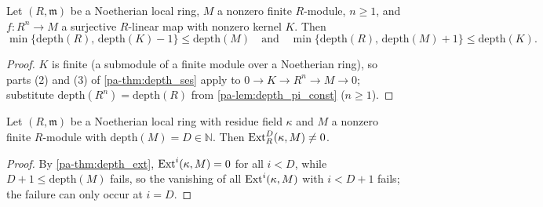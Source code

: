 \begin{lemma}
  \label{pa-lem:depth_ses_kernel}
  \leanok

  Let \((R, \mathfrak m)\) be a Noetherian local ring, \(M\) a nonzero finite
  \(R\)-module, \(n \geq 1\), and \(f : R^n \to M\) a surjective \(R\)-linear map with
  nonzero kernel \(K\). Then
  \[
    \min\{\mathrm{depth}(R),\, \mathrm{depth}(K) - 1\} \leq \mathrm{depth}(M)
    \quad\text{and}\quad
    \min\{\mathrm{depth}(R),\, \mathrm{depth}(M) + 1\} \leq \mathrm{depth}(K).
  \]
\end{lemma}
\begin{proof}
  \leanok
  \(K\) is finite (a submodule of a finite module over a Noetherian ring), so parts (2)
  and (3) of \ref{pa-thm:depth_ses} apply to \(0 \to K \to R^n \to M \to 0\); substitute
  \(\mathrm{depth}(R^n) = \mathrm{depth}(R)\) from \ref{pa-lem:depth_pi_const}
  (\(n \geq 1\)).
\end{proof}

\begin{lemma}
  \label{pa-lem:ext_nonzero_at_depth}
  \leanok

  Let \((R, \mathfrak m)\) be a Noetherian local ring with residue field \(\kappa\) and
  \(M\) a nonzero finite \(R\)-module with \(\mathrm{depth}(M) = D \in \mathbb{N}\).
  Then \(\operatorname{Ext}^D_R(\kappa, M) \neq 0\).
\end{lemma}
\begin{proof}
  \leanok
  By \ref{pa-thm:depth_ext}, \(\operatorname{Ext}^i(\kappa, M) = 0\) for all \(i < D\), while
  \(D + 1 \leq \mathrm{depth}(M)\) fails, so the vanishing of all \(\operatorname{Ext}^i(\kappa, M)\)
  with \(i < D + 1\) fails; the failure can only occur at \(i = D\).
\end{proof}

